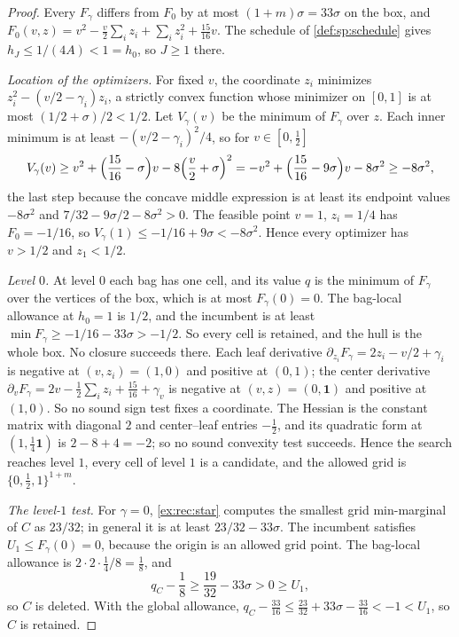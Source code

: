 \begin{proof}
Every $F_\gamma$ differs from $F_0$ by at most $(1+m)\sigma=33\sigma$ on the
box, and $F_0(v,z)=v^2-\frac v2\sum_iz_i+\sum_iz_i^2+\frac{15}{16}v$. The
schedule of \cref{def:sp:schedule} gives $h_J\le1/(4A)<1=h_0$, so $J\ge1$
there.

\emph{Location of the optimizers.} For fixed $v$, the coordinate $z_i$
minimizes $z_i^2-(v/2-\gamma_i)z_i$, a strictly convex function whose
minimizer on $[0,1]$ is at most $(1/2+\sigma)/2<1/2$. Let $V_\gamma(v)$ be
the minimum of $F_\gamma$ over $z$. Each inner minimum is at least
$-(v/2-\gamma_i)^2/4$, so for $v\in[0,\frac12]$
\[
 V_\gamma(v)\ge v^2+\Bigl(\frac{15}{16}-\sigma\Bigr)v-8\Bigl(\frac v2+\sigma\Bigr)^2
 =-v^2+\Bigl(\frac{15}{16}-9\sigma\Bigr)v-8\sigma^2\ge-8\sigma^2,
\]
the last step because the concave middle expression is at least its
endpoint values $-8\sigma^2$ and $7/32-9\sigma/2-8\sigma^2>0$. The feasible
point $v=1$, $z_i=1/4$ has $F_0=-1/16$, so $V_\gamma(1)\le-1/16+9\sigma<
-8\sigma^2$. Hence every optimizer has $v>1/2$ and $z_1<1/2$.

\emph{Level $0$.} At level $0$ each bag has one cell, and its value $q$ is
the minimum of $F_\gamma$ over the vertices of the box, which is at most
$F_\gamma(0)=0$. The bag-local allowance at $h_0=1$ is $1/2$, and the
incumbent is at least $\min F_\gamma\ge-1/16-33\sigma>-1/2$. So every cell
is retained, and the hull is the whole box. No closure succeeds there. Each
leaf derivative $\partial_{z_i}F_\gamma=2z_i-v/2+\gamma_i$ is negative at
$(v,z_i)=(1,0)$ and positive at $(0,1)$; the center derivative
$\partial_vF_\gamma=2v-\frac12\sum_iz_i+\frac{15}{16}+\gamma_v$ is negative at
$(v,z)=(0,\mathbf1)$ and positive at $(1,0)$. So no sound sign test fixes a
coordinate. The Hessian is the constant matrix with diagonal $2$ and
center--leaf entries $-\frac12$, and its quadratic form at
$(1,\frac14\mathbf1)$ is $2-8+4=-2$; so no sound convexity test succeeds.
Hence the search reaches level $1$, every cell of level $1$ is a candidate,
and the allowed grid is $\{0,\frac12,1\}^{1+m}$.

\emph{The level-$1$ test.} For $\gamma=0$, \cref{ex:rec:star} computes the
smallest grid min-marginal of $C$ as $23/32$; in general it is at least
$23/32-33\sigma$. The incumbent satisfies $U_1\le F_\gamma(0)=0$, because the
origin is an allowed grid point. The bag-local allowance is
$2\cdot2\cdot\frac14/8=\frac18$, and
\[
 q_C-\frac18\ge\frac{19}{32}-33\sigma>0\ge U_1 ,
\]
so $C$ is deleted. With the global allowance,
$q_C-\frac{33}{16}\le\frac{23}{32}+33\sigma-\frac{33}{16}<-1<U_1$, so $C$ is
retained.
\end{proof}

